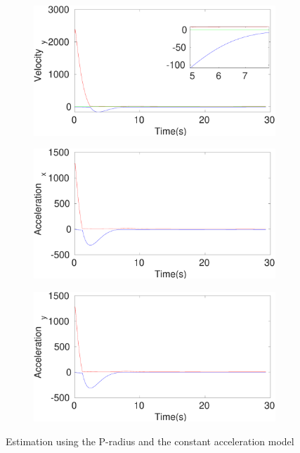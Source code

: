 \begin{figure}[h]
\begin{subfigure}{.5\linewidth}
\end{subfigure}
\begin{subfigure}{.5\linewidth}
\centering
\includegraphics[width=\linewidth]{figures/Prad/s3capradVelocity_y}
\end{subfigure}
\begin{subfigure}{.5\linewidth}
\centering
\includegraphics[width=\linewidth]{figures/Prad/s3capradAcceleration_x}
\end{subfigure}
\begin{subfigure}{.5\linewidth}
\centering
\includegraphics[width=\linewidth]{figures/Prad/s3capradAcceleration_y}
\end{subfigure}
\caption{Estimation using the P-radius and the constant acceleration model}
\end{figure}

